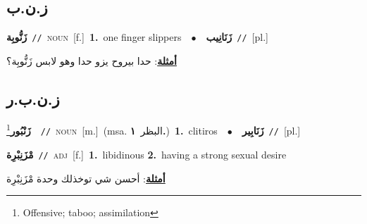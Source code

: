 \documentclass[10pt,a4paper,twoside]{article} %
\begin{document}
\begin{multicols}{2}
\vspace{-3mm}
\subsection*{\color{blue}\foreignlanguage{arabic}{ز.ن.ب}\color{blue}{}} 

{\setlength\topsep{0pt}\textbf{\foreignlanguage{arabic}{زَنُّوبِة}}\ {\color{gray}\texttt{//}\color{black}}\ \textsc{noun}\ [f.]\ \textbf{1.}~one finger slippers\ \ $\bullet$\ \ \setlength\topsep{0pt}\textbf{\foreignlanguage{arabic}{زَنَانِيب}}\ {\color{gray}\texttt{//}\color{black}}\ [pl.]\  \begin{flushright}\color{gray}\foreignlanguage{arabic}{\textbf{\underline{\foreignlanguage{arabic}{أمثلة}}}: حدا بيروح يزو حدا وهو لابس زَنُّوبِة؟}\end{flushright}\color{black}} \vspace{2mm}

\vspace{-3mm}
\subsection*{\color{blue}\foreignlanguage{arabic}{ز.ن.ب.ر}\color{blue}{}} 

{\setlength\topsep{0pt}\textbf{\foreignlanguage{arabic}{زَنْبُور}}\footnote{Offensive; taboo; assimilation}\ \ {\color{gray}\texttt{//}\color{black}}\ \textsc{noun}\ [m.]\ \color{gray}(msa. \foreignlanguage{arabic}{البظر}~\foreignlanguage{arabic}{\textbf{١.}})\color{black}\ \textbf{1.}~clitiros\ \ $\bullet$\ \ \setlength\topsep{0pt}\textbf{\foreignlanguage{arabic}{زَنَابِير}}\ {\color{gray}\texttt{//}\color{black}}\ [pl.]\ } \vspace{2mm}

{\setlength\topsep{0pt}\textbf{\foreignlanguage{arabic}{مْزَنِبْرِة}}\ {\color{gray}\texttt{//}\color{black}}\ \textsc{adj}\ [f.]\ \textbf{1.}~libidinous  \textbf{2.}~having a strong sexual desire\  \begin{flushright}\color{gray}\foreignlanguage{arabic}{\textbf{\underline{\foreignlanguage{arabic}{أمثلة}}}: أحسن شي توخذلك وحدة مْزَنِبْرِة}\end{flushright}\color{black}} \vspace{2mm}


\end{multicols}
\end{document}
